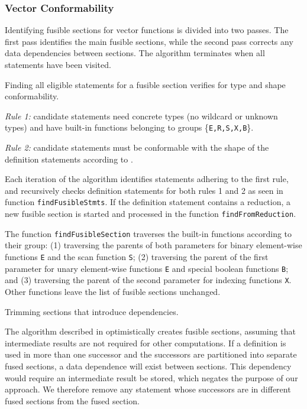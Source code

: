 \subsubsection{Vector Conformability}

Identifying fusible sections for vector functions is divided into two passes. The first
pass identifies the main fusible sections, while the second pass corrects any data
dependencies between sections. The algorithm terminates when all statements have been visited.

 Finding all eligible statements for a fusible section verifies for type
and shape conformability.

\textit{Rule 1:} candidate statements need concrete types (no wildcard or unknown types)
and have built-in functions belonging to groups \{\texttt{E,R,S,X,B}\}.

\textit{Rule 2:} candidate statements must be conformable with the shape of the definition
statements according to .

Each iteration of the algorithm identifies statements adhering to the first rule, and
recursively checks definition statements for both rules 1 and 2 as seen in function
\texttt{findFusibleStmts}. If the definition statement contains a reduction, a new
fusible section is started and processed in the function \texttt{findFromReduction}.

The function \texttt{findFusibleSection} traverses the built-in functions according to
their group:
(1) traversing the parents of both parameters for binary element-wise functions
\texttt{E} and the scan function \texttt{S};
(2) traversing the parent of the first parameter for unary element-wise
functions \texttt{E} and special boolean functions \texttt{B}; and
(3) traversing the parent of the second parameter for indexing functions \texttt{X}.
Other functions leave the list of fusible sections unchanged.

 Trimming sections that introduce dependencies.

The algorithm described in  optimistically creates fusible
sections, assuming that intermediate results are not required for other computations. If a
definition is used in more than one successor and the successors are partitioned into
separate fused sections, a data dependence will exist between sections. This dependency
would require an intermediate result be stored, which negates the purpose of our approach.
We therefore remove any statement whose successors are in different fused sections from
the fused section.


